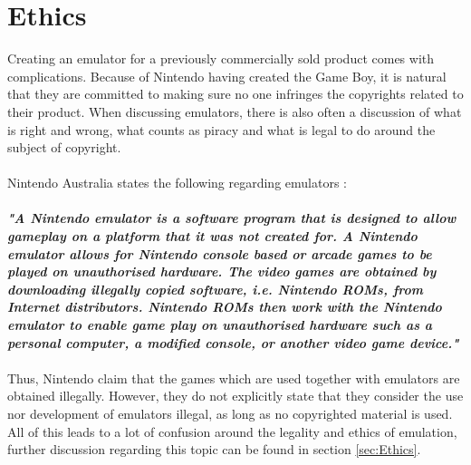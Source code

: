 \section{Ethics}
\label{sec:introEthics}
Creating an emulator for a previously commercially sold product comes with complications. Because of Nintendo having created the Game Boy, it is natural that they are committed to making sure no one infringes the copyrights related to their product. When discussing emulators, there is also often a discussion of what is right and wrong, what counts as piracy and what is legal to do around the subject of copyright. 
\\\\
Nintendo Australia  states the following regarding emulators \cite{NintendoCopyright}:
\\\\
\textit{\textbf{"A Nintendo emulator is a software program that is designed to allow gameplay on a platform that it was not created for. A Nintendo emulator allows for Nintendo console based or arcade games to be played on unauthorised hardware. The video games are obtained by downloading illegally copied software, i.e. Nintendo ROMs, from Internet distributors. Nintendo ROMs then work with the Nintendo emulator to enable game play on unauthorised hardware such as a personal computer, a modified console, or another video game device."}}
\\\\
Thus, Nintendo claim that the games which are used together with emulators are obtained illegally. However, they do not explicitly state that they consider the use nor development of emulators illegal, as long as no copyrighted material is used. All of this leads to a lot of confusion around the legality and ethics of emulation, further discussion regarding this topic can be found in section \ref{sec:Ethics}.
